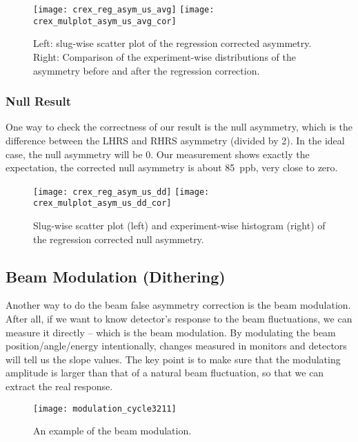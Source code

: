 \begin{figure}[!h]
    \centering
    \texttt{[image: crex\_reg\_asym\_us\_avg]}
    \texttt{[image: crex\_mulplot\_asym\_us\_avg\_cor]}
    \caption[Regression correction asymmetry]
    {Left: slug-wise scatter plot of the regression corrected asymmetry.
    Right: Comparison of the experiment-wise distributions of the asymmetry 
    before and after the regression correction.}
    \label{fig:reg_asym_us_avg}
\end{figure}

\subsubsection{Null Result}
One way to check the correctness of our result is the null asymmetry, which
is the difference between the LHRS and RHRS asymmetry (divided by 2). 
In the ideal case, the null asymmetry will be 0. Our measurement shows exactly
the expectation, the corrected null asymmetry is about 85~ppb, very close
to zero.
\begin{figure}[!h]
    \centering
    \texttt{[image: crex\_reg\_asym\_us\_dd]}
    \texttt{[image: crex\_mulplot\_asym\_us\_dd\_cor]}
    \caption{Slug-wise scatter plot (left) and experiment-wise histogram (right) of the
    regression corrected null asymmetry.}
    \label{fig:reg_asym_us_dd}
\end{figure}

\subsection{Beam Modulation (Dithering)}
Another way to do the beam false asymmetry correction is the beam modulation. After
all, if we want to know detector's response to the beam fluctuations, we can measure
it directly -- which is the beam modulation. By modulating the beam position/angle/energy
intentionally, changes measured in monitors and detectors will tell us the slope values.
The key point is to make sure that the modulating amplitude is larger than that of a
natural beam fluctuation, so that we can extract the real response.

\begin{figure}
    \centering
    \texttt{[image: modulation\_cycle3211]}
    \caption{An example of the beam modulation.}
\end{figure}

